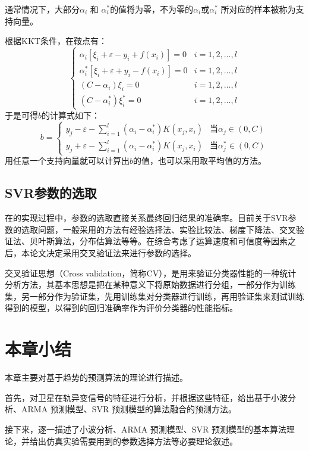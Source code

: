 通常情况下，大部分$ \alpha_i$ 和 $ \alpha_i^*$的值将为零，不为零的$ \alpha_i$或$ \alpha_i^*$ 所对应的样本被称为支持向量。

根据KKT条件，在鞍点有：
$$
\left\lbrace 
	\begin{array}{ll}
	\alpha_i[\xi_i+\varepsilon -y_i +f(x_i)] = 0 & i=1,2,\dots,l \\
	\alpha_i^*[\xi_i+\varepsilon + y_i -f(x_i)] = 0 & i=1,2,\dots,l \\
	(C-\alpha_i)\xi_i = 0& i=1,2,\dots,l \\
	(C-\alpha_i^*)\xi_i^* = 0 & i=1,2,\dots,l 
	\end{array}
\right. 
$$
于是可得$b$的计算式如下：
\begin{equation}
	b = \left\lbrace 
		\begin{array}{ll}
		y_j-\varepsilon-\sum_{i=1}^{l}(\alpha_i-\alpha_i^*)K(x_j,x_i)& \text{当}\alpha_j \in (0,C)\\
		y_j+\varepsilon-\sum_{i=1}^{l}(\alpha_i-\alpha_i^*)K(x_j,x_i)& \text{当}\alpha_j^* \in (0,C)
		\end{array}
	\right. 
\end{equation}
用任意一个支持向量就可以计算出$b$的值，也可以采用取平均值的方法。

\subsection{SVR参数的选取}
在的实现过程中，参数的选取直接关系最终回归结果的准确率。目前关于SVR参数的选取问题，一般采用的方法有经验选择法、实验比较法、梯度下降法、交叉验证法、贝叶斯算法，分布估算法等等。在综合考虑了运算速度和可信度等因素之后，本论文决定采用交叉验证法来进行参数的选择。

交叉验证思想（Cross  validation，简称CV），是用来验证分类器性能的一种统计分析方法，其基本思想是把在某种意义下将原始数据进行分组，一部分作为训练集，另一部分作为验证集，先用训练集对分类器进行训练，再用验证集来测试训练得到的模型，以得到的回归准确率作为评价分类器的性能指标。

\section{本章小结}
本章主要对基于趋势的预测算法的理论进行描述。

首先，对卫星在轨异变信号的特征进行分析，并根据这些特征，给出基于小波分析、ARMA 预测模型、SVR 预测模型的算法融合的预测方法。

接下来，逐一描述了小波分析、ARMA 预测模型、SVR 预测模型的基本算法理论，并给出仿真实验需要用到的参数选择方法等必要理论叙述。